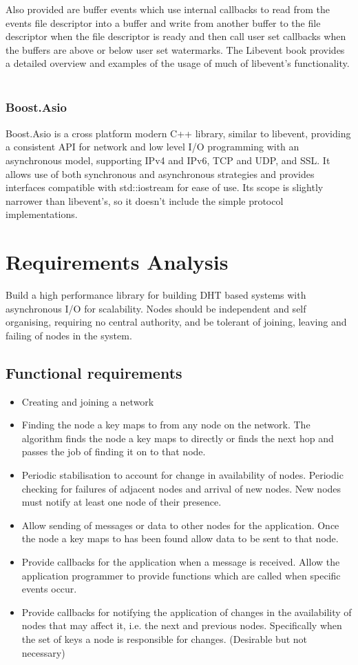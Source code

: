 \documentclass{article}
\begin{document}
Also provided are buffer events which use internal callbacks to read from the events file descriptor into a buffer and write from another buffer to the file descriptor when the file descriptor is ready and then call user set callbacks when the buffers are above or below user set watermarks.
The Libevent book\cite{libevent_book} provides a detailed overview and examples of the usage of much of libevent's functionality.
\\
\\

\subsubsection{Boost.Asio}
Boost.Asio\cite{basio} is a cross platform modern C++ library, similar to libevent, providing a consistent API for network and low level I/O programming with an asynchronous model, supporting IPv4 and IPv6, TCP and UDP, and SSL. It allows use of both synchronous and asynchronous strategies and provides interfaces compatible with std::iostream for ease of use.
Its scope is slightly narrower than libevent's, so it doesn't include the simple protocol implementations.



\section{Requirements Analysis}
Build a high performance library for building DHT based systems with asynchronous I/O for scalability. Nodes should be independent and self organising, requiring no central authority, and be tolerant of joining, leaving and failing of nodes in the system.

\subsection{Functional requirements}
\begin{itemize}
\item
Creating and joining a network
\item
Finding the node a key maps to from any node on the network.
The algorithm finds the node a key maps to directly or finds the next hop and passes the job of finding it on to that node.
\item
Periodic stabilisation to account for change in availability of nodes.
Periodic checking for failures of adjacent nodes and arrival of new nodes. New nodes must notify at least one node of their presence.
\item
Allow sending of messages or data to other nodes for the application.
Once the node a key maps to has been found allow data to be sent to that node.
\item
Provide callbacks for the application when a message is received.
Allow the application programmer to provide functions which are called when specific events occur.
\item
Provide callbacks for notifying the application of changes in the availability of nodes that may affect it, i.e. the next and previous nodes. Specifically when the set of keys a node is responsible for changes. (Desirable but not necessary)
\end{itemize}
\end{document}
